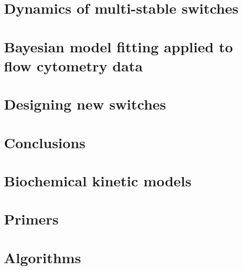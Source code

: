 \documentclass[]{phdthesis}
\begin{document}
\mainmatter*
 
\chapter{Dynamics of multi-stable switches}
\label{ch:SF}

%
%
%
%
%


\mainmatter*
\chapter{Bayesian model fitting applied to flow cytometry data}
\label{ch:Flow}

%
%

\mainmatter*
\chapter{Designing new switches}
\label{ch:desSw}


\mainmatter*
\chapter{Conclusions}
\label{ch:Conc}


\printbibliography

\appendix*
{}
\chapter{Biochemical kinetic models}
\label{ap:ODEs}

\chapter{Primers}
\label{ap:Prim}

\chapter{Algorithms}
\label{ap:Alg}

\end{document}
